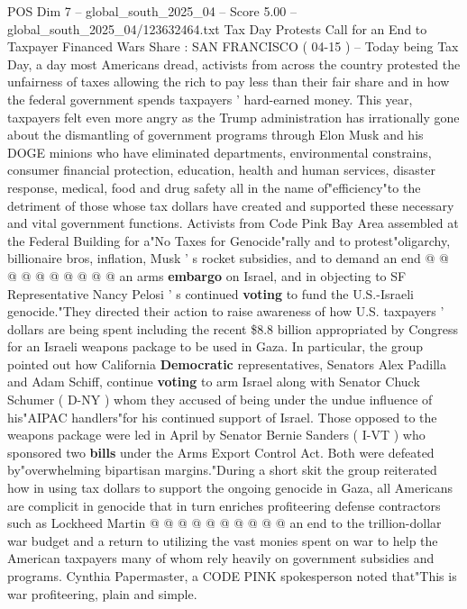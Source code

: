 \begin{textsample}{POS Dim 7 – global\_south\_2025\_04 – Score 5.00 – global\_south\_2025\_04/123632464.txt}  \label{ex:f7_pos_408}
Tax Day Protests Call for an End to Taxpayer Financed Wars Share : SAN FRANCISCO ( 04-15 ) -- Today being Tax Day, a day most Americans dread, activists from across the country protested the unfairness of taxes allowing the rich to pay less than their fair share and in how the federal government spends taxpayers ' hard-earned money.
This year, taxpayers felt even more angry as the Trump administration has irrationally gone about the dismantling of government programs through Elon Musk and his DOGE minions who have eliminated departments, environmental constrains, consumer financial protection, education, health and human services, disaster response, medical, food and drug safety all in the name of"efficiency"to the detriment of those whose tax dollars have created and supported these necessary and vital government functions.
Activists from Code Pink Bay Area assembled at the Federal Building for a"No Taxes for Genocide"rally and to protest"oligarchy, billionaire bros, inflation, Musk ' s rocket subsidies, and to demand an end @ @ @ @ @ @ @ @ @ @ an arms \textbf{embargo} on Israel, and in objecting to SF Representative Nancy Pelosi ' s continued \textbf{voting} to fund the U.S.-Israeli genocide."They directed their action to raise awareness of how U.S. taxpayers ' dollars are being spent including the recent \$8.8 billion appropriated by Congress for an Israeli weapons package to be used in Gaza.
In particular, the group pointed out how California \textbf{Democratic} representatives, Senators Alex Padilla and Adam Schiff, continue \textbf{voting} to arm Israel along with Senator Chuck Schumer ( D-NY ) whom they accused of being under the undue influence of his"AIPAC handlers"for his continued support of Israel.
Those opposed to the weapons package were led in April by Senator Bernie Sanders ( I-VT ) who sponsored two \textbf{bills} under the Arms Export Control Act.
Both were defeated by"overwhelming bipartisan margins."During a short skit the group reiterated how in using tax dollars to support the ongoing genocide in Gaza, all Americans are complicit in genocide that in turn enriches profiteering defense contractors such as Lockheed Martin @ @ @ @ @ @ @ @ @ @ an end to the trillion-dollar war budget and a return to utilizing the vast monies spent on war to help the American taxpayers many of whom rely heavily on government subsidies and programs.
Cynthia Papermaster, a CODE PINK spokesperson noted that"This is war profiteering, plain and simple.

\end{textsample}
